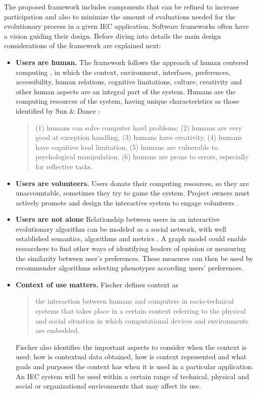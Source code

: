 The proposed framework includes components that can be refined to increase
participation and also to minimize the amount of evaluations needed for the evolutionary 
process in a given IEC application. Software frameworks often have 
a vision \cite{carneiro2010introducing} guiding their
design. Before diving into details the main design considerations of the
framework are explained next: 

\begin{itemize}
\item {\bf Users are human.} 
  The framework follows the approach of human centered computing \cite{sebe2010human},
  in which the context, environment, interfaces, preferences, accessibility, human relations,
  cognitive limitations, culture, creativity and other human aspects are an integral part 
  of the system. Humans are the computing resources of the system, having unique characteristics
  as those identified by Sun \& Dance \cite{Sun2013}:
\begin{quote}
  (1) humans can solve computer hard problems; (2) humans are very good at exception handling,
  (3) humans have creativity, (4) humans have cognitive load limitation, (5) humans are
  vulnerable to psychological manipulation, (6) humans are prone to errors,
  especially for reflective tasks.
\end{quote}  


\item {\bf Users are volunteers.} Users donate their computing resources, so they are 
unaccountable, sometimes they try to game the system. Project owners must actively promote and
design the interactive system to engage volunteers \cite{oh2015clicking}. %
\item {\bf Users are not alone}
  Relationship between users in an interactive evolutionary algorithm can be modeled
  as a social network, with well established semantics, algorithms and metrics 
  \cite{ahuja1993network}.
  A graph model could enable researchers to find other ways of identifying leaders of 
  opinion or measuring the similarity between user's preferences. 
  These measures can then be used by recommender algorithms selecting 
  phenotypes according users' preferences. 

\item {\bf Context of use matters.}
  Fischer \cite{fischer2012context}
  defines context as
  \begin{quote}
  the interaction between humans and
  computers in socio-technical systems that takes place in a certain
  context referring to the physical and social situation in which
  computational devices and environments are embedded.
\end{quote}   
  Fischer also identifies the important aspects to consider when the context is used: how is
  contextual data obtained, how is context represented and what
  goals and purposes the context has when it is used in a particular
  application. An IEC system will  be used within a certain range 
  of technical, physical and social or
  organizational environments \cite{maguire2001context} that may affect its use.
 

\end{itemize}
